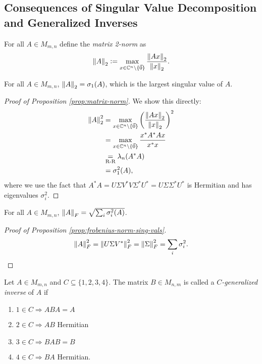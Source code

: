\subsection{Consequences of Singular Value Decomposition and Generalized Inverses}

\begin{definition}
\label{matrix-2-norm}
For all $A \in M_{m,n}$ define the \textit{matrix 2-norm} as
$$
\left\lVert A\right\rVert_2 \vcentcolon= \max_{x \in \mathbb C^n \setminus \{\Vec{0}\}} \frac{\left\lVert Ax\right\rVert_2}{\left\lVert x\right\rVert_2}.
$$
\end{definition}

\begin{proposition}
\label{prop:matrix-norm}
For all $A \in M_{m,n}$, $\left\lVert A\right\rVert_2 = \sigma_1(A)$, which is the largest singular value of $A$.
\end{proposition}

\begin{proof}[Proof of Proposition \ref{prop:matrix-norm}]
We show this directly:
\begin{align*}
    \left\lVert A\right\rVert_2^2 
        &= \max_{x \in \mathbb C^n \setminus \{\Vec{0}\}} \left(\frac{\left\lVert Ax\right\rVert_2}{\left\lVert x\right\rVert_2}\right)^2 \\
        &= \max_{x \in \mathbb C^n \setminus \{\Vec{0}\}} \frac{x^*A^*Ax}{x^*x} \\
        &\underset{\text{R-R}}{=} \lambda_n(A^*A) \\
        &= \sigma_1^2(A),
\end{align*}
where we use the fact that $A^*A = U\Sigma V^*V\Sigma^*U^* = U\Sigma\Sigma^*U^*$ is Hermitian and has eigenvalues $\sigma_i^2$.
\end{proof}

\begin{proposition}
\label{prop:frobenius-norm-sing-vals}
For all $A \in M_{m,n}$, $\left\lVert A\right\rVert_F = \sqrt{\sum_i \sigma_i^2(A)}$.
\end{proposition}

\begin{proof}[Proof of Proposition \ref{prop:frobenius-norm-sing-vals}]
$$
\left\lVert A\right\rVert_F^2 = \left\lVert U\Sigma V^*\right\rVert_F^2 = \left\lVert\Sigma\right\rVert_F^2 = \sum_{i} \sigma_i^2.
$$
\end{proof}

\begin{definition}
\label{def:C-generalized-inverse}
Let $A \in M_{m,n}$ and $C \subseteq \{1,2,3,4\}$. The matrix $B \in M_{n,m}$ is called a \textit{$C$-generalized inverse} of $A$ if
\begin{enumerate}[label=(\roman*)]
    \item $1 \in C \Longrightarrow ABA = A$
    \item $2 \in C \Longrightarrow AB$ Hermitian
    \item $3 \in C \Longrightarrow BAB = B$
    \item $4 \in C \Longrightarrow BA$ Hermitian.
\end{enumerate}
\end{definition}

